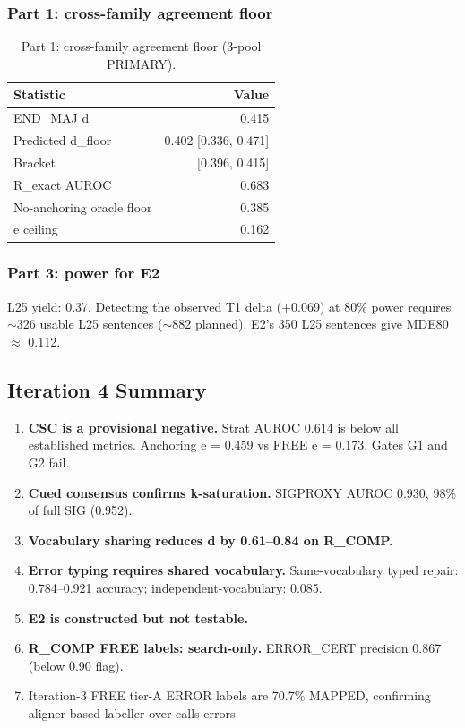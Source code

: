 \documentclass[11pt,letterpaper]{article}
\begin{document}
\subsubsection{Part 1: cross-family agreement floor}

\begin{table}[!htbp]
\centering
\caption{Part 1: cross-family agreement floor (3-pool PRIMARY).}
\label{tab:agreement_floor}
\begin{tabular}{lr}
\toprule
Statistic & Value \\
\midrule
END\_MAJ d & 0.415 \\
Predicted d\_floor & 0.402 [0.336, 0.471] \\
Bracket & [0.396, 0.415] \\
R\_exact AUROC & 0.683 \\
No-anchoring oracle floor & 0.385 \\
e ceiling & 0.162 \\
\bottomrule
\end{tabular}
\end{table}

\subsubsection{Part 3: power for E2}

L25 yield: 0.37. Detecting the observed T1 delta (+0.069) at 80\% power requires $\sim$326 usable L25 sentences ($\sim$882 planned). E2's 350 L25 sentences give MDE80 $\approx$ 0.112.

\subsection{Iteration 4 Summary}

\begin{enumerate}
\item \textbf{CSC is a provisional negative.} Strat AUROC 0.614 is below all established metrics. Anchoring e = 0.459 vs FREE e = 0.173. Gates G1 and G2 fail.
\item \textbf{Cued consensus confirms k-saturation.} SIGPROXY AUROC 0.930, 98\% of full SIG (0.952).
\item \textbf{Vocabulary sharing reduces d by 0.61--0.84 on R\_COMP.}
\item \textbf{Error typing requires shared vocabulary.} Same-vocabulary typed repair: 0.784--0.921 accuracy; independent-vocabulary: 0.085.
\item \textbf{E2 is constructed but not testable.}
\item \textbf{R\_COMP FREE labels: search-only.} ERROR\_CERT precision 0.867 (below 0.90 flag).
\item Iteration-3 FREE tier-A ERROR labels are 70.7\% MAPPED, confirming aligner-based labeller over-calls errors.
\end{enumerate}
\end{document}
